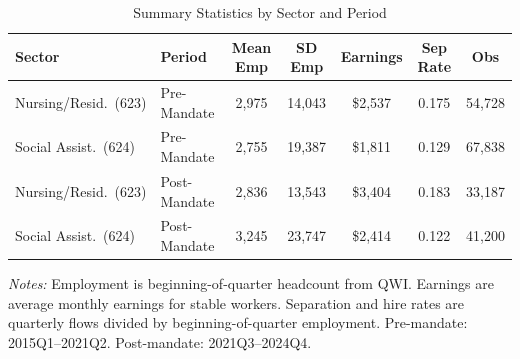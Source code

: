 \begin{table}[htbp]
\centering
\caption{Summary Statistics by Sector and Period}
\label{tab:summary}
\begin{threeparttable}
\small
\begin{tabular}{@{}llccccc@{}}
\hline\hline
Sector & Period & Mean Emp & SD Emp & Earnings & Sep Rate & Obs \\
\hline
Nursing/Resid.\ (623) & Pre-Mandate & 2,975 & 14,043 & \$2,537 & 0.175 & 54,728 \\
Social Assist.\ (624) & Pre-Mandate & 2,755 & 19,387 & \$1,811 & 0.129 & 67,838 \\
Nursing/Resid.\ (623) & Post-Mandate & 2,836 & 13,543 & \$3,404 & 0.183 & 33,187 \\
Social Assist.\ (624) & Post-Mandate & 3,245 & 23,747 & \$2,414 & 0.122 & 41,200 \\
\hline\hline
\end{tabular}
\begin{tablenotes}[flushleft]
\small
\item \textit{Notes:} Employment is beginning-of-quarter headcount from QWI.
Earnings are average monthly earnings for stable workers.
Separation and hire rates are quarterly flows divided by beginning-of-quarter employment.
Pre-mandate: 2015Q1--2021Q2. Post-mandate: 2021Q3--2024Q4.
\end{tablenotes}
\end{threeparttable}
\end{table}
